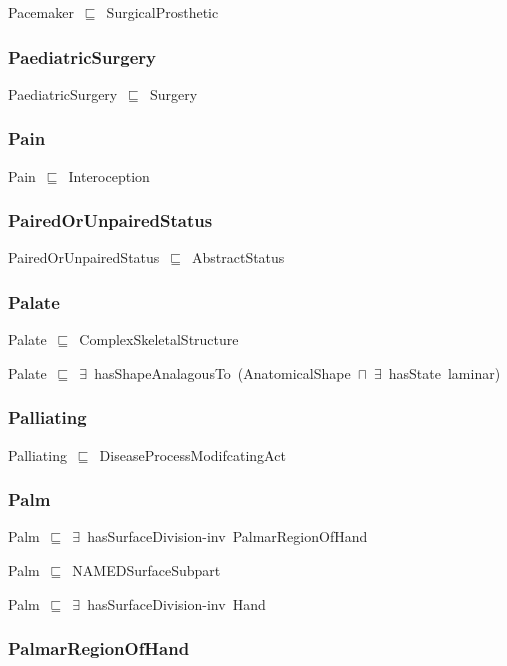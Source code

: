 \documentclass{article}
\begin{document}
Pacemaker~\ensuremath{\sqsubseteq}~SurgicalProsthetic~

\subsubsection*{PaediatricSurgery}

PaediatricSurgery~\ensuremath{\sqsubseteq}~Surgery~

\subsubsection*{Pain}

Pain~\ensuremath{\sqsubseteq}~Interoception~

\subsubsection*{PairedOrUnpairedStatus}

PairedOrUnpairedStatus~\ensuremath{\sqsubseteq}~AbstractStatus~

\subsubsection*{Palate}

Palate~\ensuremath{\sqsubseteq}~ComplexSkeletalStructure~

Palate~\ensuremath{\sqsubseteq}~\ensuremath{\exists}~hasShapeAnalagousTo~(AnatomicalShape~\ensuremath{\sqcap}~\ensuremath{\exists}~hasState~laminar)~

\subsubsection*{Palliating}

Palliating~\ensuremath{\sqsubseteq}~DiseaseProcessModifcatingAct~

\subsubsection*{Palm}

Palm~\ensuremath{\sqsubseteq}~\ensuremath{\exists}~hasSurfaceDivision-inv~PalmarRegionOfHand~

Palm~\ensuremath{\sqsubseteq}~NAMEDSurfaceSubpart~

Palm~\ensuremath{\sqsubseteq}~\ensuremath{\exists}~hasSurfaceDivision-inv~Hand~

\subsubsection*{PalmarRegionOfHand}
\end{document}
